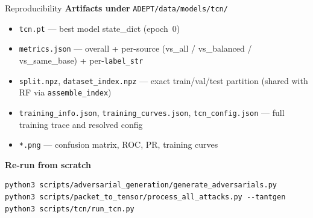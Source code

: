 \documentclass[10pt,aspectratio=169]{beamer}
\begin{document}
\begin{frame}[fragile]{Reproducibility}
\textbf{Artifacts under} \texttt{ADEPT/data/models/tcn/}
\begin{itemize}\small
  \item \texttt{tcn.pt} --- best model state\_dict (epoch~0)
  \item \texttt{metrics.json} --- overall + per-source (vs\_all / vs\_balanced /
        vs\_same\_base) + per-\texttt{label\_str}
  \item \texttt{split.npz}, \texttt{dataset\_index.npz} --- exact train/val/test
        partition (shared with RF via \texttt{assemble\_index})
  \item \texttt{training\_info.json}, \texttt{training\_curves.json},
        \texttt{tcn\_config.json} --- full training trace and resolved config
  \item \texttt{*.png} --- confusion matrix, ROC, PR, training curves
\end{itemize}

\vspace{0.6em}
\textbf{Re-run from scratch}
\begin{block}{}
\small
\begin{verbatim}
python3 scripts/adversarial_generation/generate_adversarials.py
python3 scripts/packet_to_tensor/process_all_attacks.py --tantgen
python3 scripts/tcn/run_tcn.py
\end{verbatim}
\end{block}
\end{frame}
\end{document}

